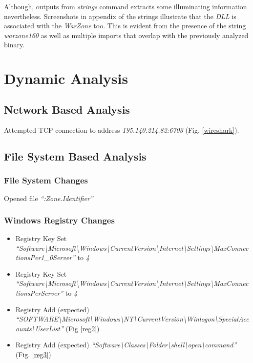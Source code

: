 \documentclass[10pt,a4paper]{article}
\begin{document}
Although, outputs from \textit{strings} command extracts some illuminating information nevertheless.
Screenshots in appendix of the strings illustrate that the \textit{DLL} is associated with the \textit{WarZone} too. This is evident from the presence of the string \textit{warzone160} as well as multiple imports that overlap with the previously analyzed binary.

\section{Dynamic Analysis}
		\subsection{Network Based Analysis}
			Attempted TCP connection to address \textit{195.140.214.82:6703} (Fig. \ref{wireshark}).

		\subsection{File System Based Analysis}
				\subsubsection{File System Changes}
				Opened file \textit{``:Zone.Identifier''}
				\subsubsection{Windows Registry Changes}
				\begin{itemize}
					\item Registry Key Set \textit{``Software\textbackslash Microsoft\textbackslash Windows\textbackslash CurrentVersion\textbackslash Internet\textbackslash Settings\textbackslash MaxConnectionsPer1\_0Server''} to \textit{4}
					\item Registry Key Set \textit{``Software\textbackslash Microsoft\textbackslash Windows\textbackslash CurrentVersion\textbackslash Internet\textbackslash Settings\textbackslash MaxConnectionsPerServer''} to \textit{4}
					\item Registry Add (expected) \textit{``SOFTWARE\textbackslash Microsoft\textbackslash Windows\textbackslash NT\textbackslash CurrentVersion\textbackslash Winlogon\textbackslash SpecialAccounts\textbackslash UserList''} (Fig \ref{reg2})
					\item Registry Add (expected) \textit{``Software\textbackslash Classes\textbackslash Folder\textbackslash shell\textbackslash open\textbackslash command''} (Fig. \ref{reg3})
				\end{itemize}
\end{document}
